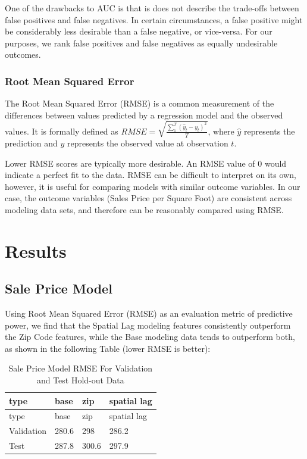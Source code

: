 \documentclass[12pt,]{article}
\begin{document}
One of the drawbacks to AUC is that is does not describe the trade-offs
between false positives and false negatives. In certain circumstances, a
false positive might be considerably less desirable than a false
negative, or vice-versa. For our purposes, we rank false positives and
false negatives as equally undesirable outcomes.

\hypertarget{root-mean-squared-error}{%
\subsubsection{Root Mean Squared Error}\label{root-mean-squared-error}}

The Root Mean Squared Error (RMSE) is a common measurement of the
differences between values predicted by a regression model and the
observed values. It is formally defined as
\(RMSE = \sqrt{ \frac{\sum_{1}^{T} (\hat{y}_t - y_t)^2}{T} }\), where
\(\hat{y}\) represents the prediction and \(y\) represents the observed
value at observation \(t\).

Lower RMSE scores are typically more desirable. An RMSE value of 0 would
indicate a perfect fit to the data. RMSE can be difficult to interpret
on its own, however, it is useful for comparing models with similar
outcome variables. In our case, the outcome variables (Sales Price per
Square Foot) are consistent across modeling data sets, and therefore can
be reasonably compared using RMSE.

\hypertarget{results}{%
\section{Results}\label{results}}

\hypertarget{sale-price-model}{%
\subsection{Sale Price Model}\label{sale-price-model}}

Using Root Mean Squared Error (RMSE) as an evaluation metric of
predictive power, we find that the Spatial Lag modeling features
consistently outperform the Zip Code features, while the Base modeling
data tends to outperform both, as shown in the following Table (lower
RMSE is better):

\begin{longtable}[]{@{}llll@{}}
\caption{Sale Price Model RMSE For Validation and Test Hold-out
Data}\tabularnewline
\toprule
type & base & zip & spatial lag\tabularnewline
\midrule
\endfirsthead
\toprule
type & base & zip & spatial lag\tabularnewline
\midrule
\endhead
Validation & 280.6 & 298 & 286.2\tabularnewline
Test & 287.8 & 300.6 & 297.9\tabularnewline
\bottomrule
\end{longtable}
\end{document}
